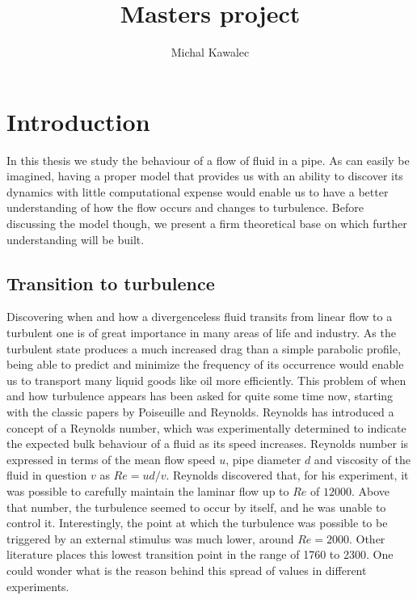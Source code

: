 \documentclass[11pt,a4paper]{article}
\begin{document}
\title{Masters project}
\author{Michal Kawalec}
\clearpage\maketitle

\begin{abstract}
\end{abstract}
\thispagestyle{empty}
\newpage

\section{Introduction}

In this thesis we study the behaviour of a flow of fluid in a pipe.
As can easily be imagined, having a proper model that provides us with an ability to discover its dynamics with little computational expense would enable us to have a better understanding of how the flow occurs and changes to turbulence.
Before discussing the model though, we present a firm theoretical base on which further understanding will be built.

\subsection{Transition to turbulence}
Discovering when and how a divergenceless fluid transits from linear flow to a turbulent one is of great importance in many areas of life and industry.
As the turbulent state produces a much increased drag than a simple parabolic profile, being able to predict and minimize the frequency of its occurrence would enable us to transport many liquid goods like oil more efficiently.
This problem of when and how turbulence appears has been asked for quite some time now, starting with the classic papers by Poiseuille\cite{Poiseuille40} and Reynolds\cite{Reynolds83}.
Reynolds has introduced a concept of a Reynolds number, which was experimentally determined to indicate the expected bulk behaviour of a fluid as its speed increases.
Reynolds number is expressed in terms of the mean flow speed \(u\), pipe diameter \(d\) and viscosity of the fluid in question \(v\) as \(Re = ud/v\).
Reynolds discovered that, for his experiment, it was possible to carefully maintain the laminar flow up to \(Re\) of \(12000\).
Above that number, the turbulence seemed to occur by itself, and he was unable to control it.
Interestingly, the point at which the turbulence was possible to be triggered by an external stimulus was much lower, around \(Re = 2000\).
Other literature places this lowest transition point in the range of 1760 to 2300\cite{Kerswell05}.
One could wonder what is the reason behind this spread of values in different experiments.
\end{document}
